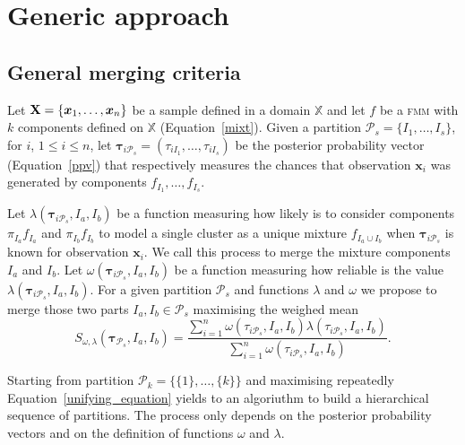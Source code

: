 \documentclass[submit]{smj}
\theoremstyle{definition}
\newcommand{\m}[1]{\boldsymbol{#1}}
\newcommand{\fmm}{\textsc{fmm}\xspace}
\begin{document}
\section{Generic approach}\label{generic_merging}

\subsection{General merging criteria}\label{merging_criteria}

Let $\text{\textbf{X}} = \{\m x_1,\dots,\m x_n \}$ be a sample defined in  a domain $\mathbb{X}$ and let $f$ be a \fmm with $k$ components defined on $\mathbb{X}$ (Equation~\ref{mixt}). Given a partition $\mathcal{P}_s = \{I_1, \dots, I_s\}$, for $i$, $1\leq i \leq n $, let $\m\tau_{i \mathcal{P}_s}= \left( \tau_{i I_1} , \dots, \tau_{i I_s}  \right)$ be the posterior probability vector (Equation~\ref{ppv}) that respectively measures the chances that observation $\m x_i$ was generated by components $f_{I_1}, \dots, f_{I_s}$.


Let $\lambda(\m\tau_{i \mathcal{P}_s},  I_a,  I_b)$ be a function measuring how likely is to consider components $\pi_{I_a} f_{I_a}$ and $\pi_{I_b} f_{I_b}$ to model a single cluster as a unique mixture $f_{I_a \cup I_b}$ when $\m \tau_{i \mathcal{P}_s}$ is known for observation $\m x_i$. We call this process to merge the mixture components $I_a$ and $I_b$. Let $\omega(\m\tau_{i \mathcal{P}_s},  I_a,  I_b)$ be a function measuring how reliable is the value $\lambda(\m\tau_{i \mathcal{P}_s},  I_a,  I_b)$.  For a given partition $\mathcal{P}_s$ and functions $\lambda$ and $\omega$ we propose to merge those two parts $I_a, I_b \in \mathcal{P}_s$ maximising the weighed mean
\begin{equation}\label{unifying_equation}
S_{\omega, \lambda}( \m\tau_{\mathcal{P}_s},  I_a,  I_b) = \frac{\sum_{i=1}^n \omega(\tau_{i \mathcal{P}_s}, I_a, I_b) \lambda(\tau_{i \mathcal{P}_s}, I_a, I_b)}{\sum_{i=1}^n \omega(\tau_{i \mathcal{P}_s}, I_a, I_b) }.
\end{equation}


Starting from partition $\mathcal{P}_k = \{ \{1\}, \dots, \{k\} \}$ and maximising repeatedly Equation~\ref{unifying_equation} yields to an algoriuthm to build a hierarchical sequence of partitions. The process only depends on the posterior probability vectors and on the definition of functions $\omega$ and $\lambda$. %
\end{document}

